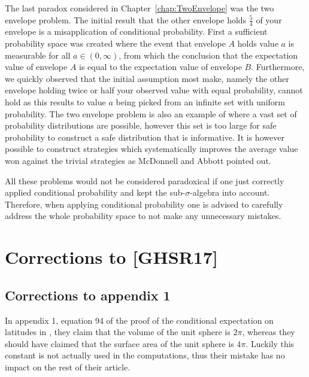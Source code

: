 \documentclass[a4paper]{report}
\theoremstyle{plain}
\theoremstyle{definition}
\theoremstyle{remark}
\numberwithin{equation}{chapter}
\DeclareMathOperator{\1}{\mathbbm{1}}
\begin{document}
The last paradox considered in Chapter~\ref{chap:TwoEnvelope} was the two envelope problem. The initial result that the other envelope holds $\frac{5}{4}$ of your envelope is a misapplication of conditional probability. First a sufficient probability space was created where the event that envelope $A$ holds value $a$ is measurable for all $a\in(0,\infty)$, from which the conclusion that the expectation value of envelope $A$ is equal to the expectation value of envelope $B$. Furthermore, we quickly observed that the initial assumption most make, namely the other envelope holding twice or half your observed value with equal probability, cannot hold as this results to value $a$ being picked from an infinite set with uniform probability. The two envelope problem is also an example of where a vast set of probability distributions are possible, however this set is too large for safe probability to construct a safe distribution that is informative. It is however possible to construct strategies which systematically improves the average value won against the trivial strategies as McDonnell and Abbott \cite{McDonnell09,Abbott10,McDonnell11} pointed out.

All these problems would not be considered paradoxical if one just correctly applied conditional probability and kept the sub-$\sigma$-algebra into account. Therefore, when applying conditional probability one is advised to carefully address the whole probability space to not make any unnecessary mistakes.




\appendix
\chapter{Corrections to [GHSR17]}
\section{Corrections to appendix 1}\label{app:CorLong}
In appendix 1, equation 94 of the proof of the conditional expectation on latitudes in \cite{Gyenis17}, they claim that the volume of the unit sphere is $2\pi$, whereas they should have claimed that the surface area of the unit sphere is $4\pi$. Luckily this constant is not actually used in the computations, thus their mistake has no impact on the rest of their article.
\end{document}
